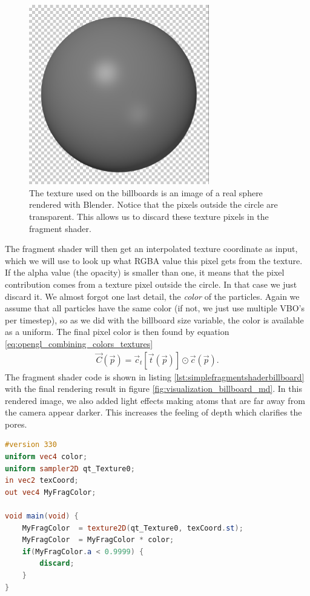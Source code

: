 \begin{figure}[h]
\begin{center}
\includegraphics[width=0.7\textwidth, trim=0cm 0cm 0cm 0cm, clip]{visualization/figures/texture_transparent.png}
\end{center}
\caption{The texture used on the billboards is an image of a real sphere rendered with Blender. Notice that the pixels outside the circle are transparent. This allows us to discard these texture pixels in the fragment shader.}
\label{fig:visualization_billboard_texture}
\end{figure}
The fragment shader will then get an interpolated texture coordinate as input, which we will use to look up what RGBA value this pixel gets from the texture. If the alpha value (the opacity) is smaller than one, it means that the pixel contribution comes from a texture pixel outside the circle. In that case we just discard it. We almost forgot one last detail, the \textit{color} of the particles. Again we assume that all particles have the same color (if not, we just use multiple VBO's per timestep), so as we did with the billboard size variable, the color is available as a uniform. The final pixel color is then found by equation \eqref{eq:opengl_combining_colors_textures}
\begin{align}
	\nonumber
	\vec C(\vec p) = \vec c_t[\vec t(\vec p)] \odot \vec c(\vec p).
\end{align}
The fragment shader code is shown in listing \ref{lst:simplefragmentshaderbillboard} with the final rendering result in figure \ref{fig:visualization_billboard_md}. In this rendered image, we also added light effects making atoms that are far away from the camera appear darker. This increases the feeling of depth which clarifies the pores.
\begin{lstlisting}[caption=billboardFragmentShader.glsl, label=lst:simplefragmentshaderbillboard, language=GLSL]
#version 330
uniform vec4 color;
uniform sampler2D qt_Texture0;
in vec2 texCoord;
out vec4 MyFragColor;

void main(void) {
    MyFragColor  = texture2D(qt_Texture0, texCoord.st);
    MyFragColor  = MyFragColor * color;
    if(MyFragColor.a < 0.9999) {
        discard;
    }
}

\end{lstlisting}

